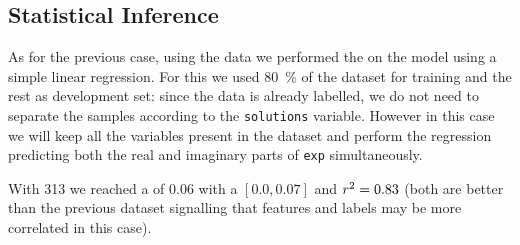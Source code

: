 \subsection{Statistical Inference}

As for the previous case, using the \eda data we performed the \anova on the \wzw model using a simple linear regression.
For this we used \SI{80}{\percent} of the dataset for training and the rest as development set: since the data is already labelled, we do not need to separate the samples according to the \texttt{solutions} variable.
However in this case we will keep all the variables present in the dataset and perform the regression predicting both the real and imaginary parts of \texttt{exp} simultaneously.

With 313 \dof we reached a \mse of 0.06 with a \ci $\left[0.0, 0.07\right]$ and $r^2 = 0.83$ (both are better than the previous dataset signalling that features and labels may be more correlated in this case).


